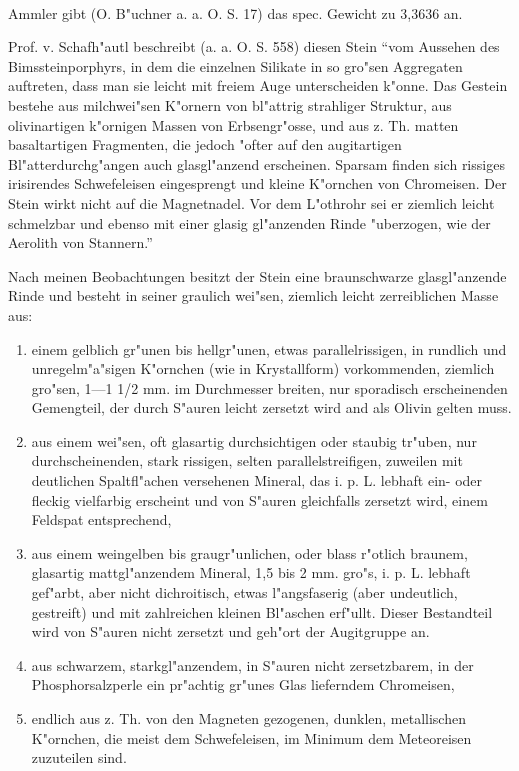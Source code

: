 \documentclass[a4paper, 11pt, oneside]{article}
\begin{document}
\paragraph{}
Ammler gibt (O. B"uchner a. a. O. S. 17) das spec. Gewicht zu 3,3636 an.

Prof. v. Schafh"autl beschreibt (a. a. O. S. 558) diesen Stein "`vom Aussehen des Bimssteinporphyrs, in dem die einzelnen Silikate in so gro"sen Aggregaten auftreten, dass man sie leicht mit freiem Auge unterscheiden k"onne. Das Gestein bestehe aus milchwei"sen K"ornern von bl"attrig strahliger Struktur, aus olivinartigen k"ornigen Massen von Erbsengr"osse, und aus z. Th. matten basaltartigen Fragmenten, die jedoch "ofter auf den augitartigen Bl"atterdurchg"angen auch glasgl"anzend erscheinen. Sparsam finden sich rissiges irisirendes Schwefeleisen eingesprengt und kleine K"ornchen von Chromeisen. Der Stein wirkt nicht auf die Magnetnadel. Vor dem L"othrohr sei er ziemlich leicht schmelzbar und ebenso mit einer glasig gl"anzenden Rinde "uberzogen, wie der Aerolith von Stannern."'

Nach meinen Beobachtungen besitzt der Stein eine braunschwarze glasgl"anzende Rinde und besteht in seiner graulich wei"sen, ziemlich leicht zerreiblichen Masse aus:
\begin{enumerate}
    \item einem gelblich gr"unen bis hellgr"unen, etwas parallelrissigen, in rundlich und unregelm"a"sigen K"ornchen (wie in Krystallform) vorkommenden, ziemlich gro"sen, 1---1 1/2 mm. im Durchmesser breiten, nur sporadisch erscheinenden Gemengteil, der durch S"auren leicht zersetzt wird and als Olivin gelten muss.
    \item aus einem wei"sen, oft glasartig durchsichtigen oder staubig tr"uben, nur durchscheinenden, stark rissigen, selten parallelstreifigen, zuweilen mit deutlichen Spaltfl"achen versehenen Mineral, das i. p. L. lebhaft ein- oder fleckig vielfarbig erscheint und von S"auren gleichfalls zersetzt wird, einem Feldspat entsprechend,
    \item aus einem weingelben bis graugr"unlichen, oder blass r"otlich braunem, glasartig mattgl"anzendem Mineral, 1,5 bis 2 mm. gro"s, i. p. L. lebhaft gef"arbt, aber nicht dichroitisch, etwas l"angsfaserig (aber undeutlich, gestreift) und mit zahlreichen kleinen Bl"aschen erf"ullt. Dieser Bestandteil wird von S"auren nicht zersetzt und geh"ort der Augitgruppe an.
    \item aus schwarzem, starkgl"anzendem, in S"auren nicht zersetzbarem, in der Phosphorsalzperle ein pr"achtig gr"unes Glas lieferndem Chromeisen,
    \item endlich aus z. Th. von den Magneten gezogenen, dunklen, metallischen K"ornchen, die meist dem Schwefeleisen, im Minimum dem Meteoreisen zuzuteilen sind.
\end{enumerate}
\end{document}
